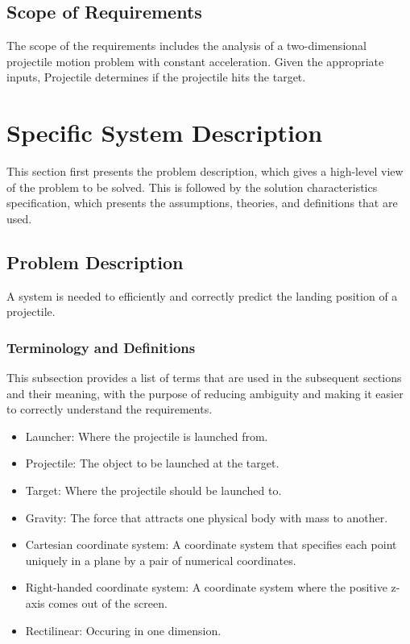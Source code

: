 \documentclass[12pt]{article}
\begin{document}
\subsection{Scope of Requirements}
\label{Sec:ReqsScope}
The scope of the requirements includes the analysis of a two-dimensional projectile motion problem with constant acceleration. Given the appropriate inputs, Projectile determines if the projectile hits the target.
\section{Specific System Description}
\label{Sec:SpecSystDesc}
This section first presents the problem description, which gives a high-level view of the problem to be solved. This is followed by the solution characteristics specification, which presents the assumptions, theories, and definitions that are used.
\subsection{Problem Description}
\label{Sec:ProbDesc}
A system is needed to efficiently and correctly predict the landing position of a projectile.
\subsubsection{Terminology and Definitions}
\label{Sec:TermDefs}
This subsection provides a list of terms that are used in the subsequent sections and their meaning, with the purpose of reducing ambiguity and making it easier to correctly understand the requirements.
\begin{itemize}
\item{Launcher: Where the projectile is launched from.}
\item{Projectile: The object to be launched at the target.}
\item{Target: Where the projectile should be launched to.}
\item{Gravity: The force that attracts one physical body with mass to another.}
\item{Cartesian coordinate system: A coordinate system that specifies each point uniquely in a plane by a pair of numerical coordinates.}
\item{Right-handed coordinate system: A coordinate system where the positive z-axis comes out of the screen.}
\item{Rectilinear: Occuring in one dimension.}
\end{itemize}
\end{document}

